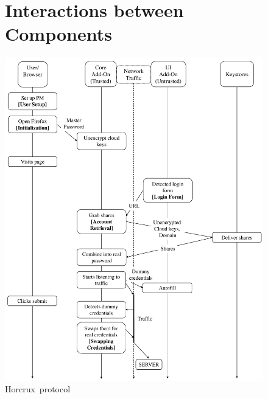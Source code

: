 \documentclass[sigconf, anonymous]{acmart}
\newcommand*\SecPass{Horcrux}
\begin{document}

\maketitle











% 

%


\clearpage

\appendix


\begin{figure}[!ht]
\section{Interactions between Components}
\centering
\includegraphics[height={0.9\textheight}]{Horcrux_protocol.pdf}
\caption{\SecPass\ protocol }
\label{horcrux_diagram}
\end{figure}
\clearpage
\end{document}
